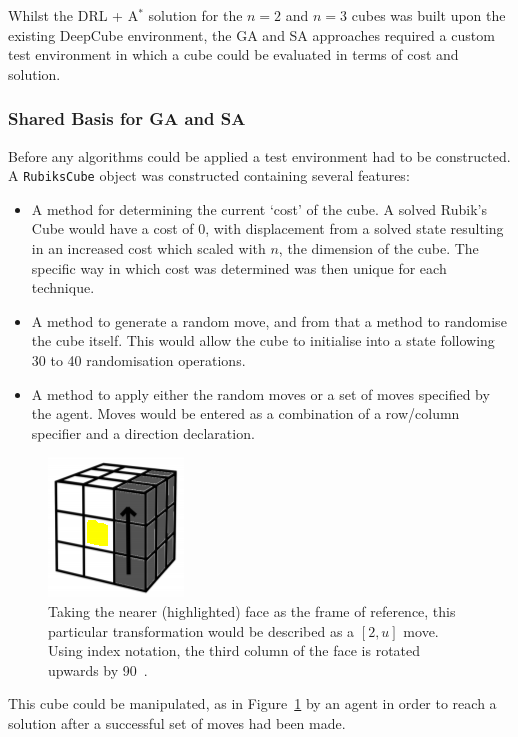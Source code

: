 \documentclass[UKenglish]{svproc}
\begin{document}
Whilst the DRL + A$^{\ast}$ solution for the $n=2$ and $n=3$ cubes was built upon the existing DeepCube environment, the GA and SA approaches required a custom test environment in which a cube could be evaluated in terms of cost and solution.

\subsubsection{Shared Basis for GA and SA}
Before any algorithms could be applied a test environment had to be constructed. A \verb|RubiksCube| object was constructed containing several features:
\begin{itemize}
    \item A method for determining the current `cost' of the cube. A solved Rubik's Cube would have a cost of 0, with displacement from a solved state resulting in an increased cost which scaled with $n$, the dimension of the cube. The specific way in which cost was determined was then unique for each technique.
    \item A method to generate a random move, and from that a method to randomise the cube itself. This would allow the cube to initialise into a state following 30 to 40 randomisation operations.
    \item A method to apply either the random moves or a set of moves specified by the agent. Moves would be entered as a combination of a row/column specifier and a direction declaration.
\end{itemize}

\begin{figure}[!ht]
  \centering
  \includegraphics[width=0.2\linewidth]{move-3u}
  \caption{Taking the nearer (highlighted) face as the frame of reference, this
    particular transformation would be described as a $[2,u]$ move. Using index
    notation, the third column of the face is rotated upwards by
    90\textdegree~\cite{proj_l.hoang}.}
  \label{fig:move-3u}
\end{figure}

This cube could be manipulated, as in Figure~\ref{fig:move-3u} by an agent in order to reach a solution after a successful set of moves had been made.
\end{document}
